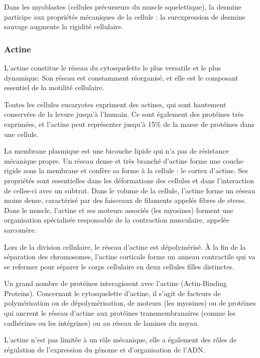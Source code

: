 Dans les myoblastes (cellules précurseurs du muscle squelettique), la desmine participe aux propriétés mécaniques de la cellule : la surexpression de desmine sauvage augmente la rigidité cellulaire. 





\subsubsection{Actine}
  
L'actine constitue le réseau du cytosquelette le plus versatile et le plus dynamique. Son réseau est constamment réorganisé, et elle est le composant essentiel de la motilité cellulaire. 

Toutes les cellules eucaryotes expriment des actines, qui sont hautement conservées de la levure jusqu'à l'humain. Ce sont également des protéines très exprimées, et l'actine peut représenter jusqu'à 15\% de la masse de protéines dans une cellule. 

La membrane plasmique est une bicouche lipide qui n'a pas de résistance mécanique propre. Un réseau dense et très branché d'actine forme une couche rigide sous la membrane et confère sa forme à la cellule : le cortex d'actine. Ses propriétés sont essentielles dans les déformations des cellules et dans l'interaction de celles-ci avec un subtrat. 
Dans le volume de la cellule, l'actine forme un réseau moins dense, caractérisé par des faisceaux de filaments appelés fibres de stress. 
Dans le muscle, l'actine et ses moteurs associés (les myosines) forment une organisation spécialisée responsable de la contraction musculaire, appelée sarcomère. 

Lors de la division cellulaire, le réseau d'actine est dépolymérisé. À la fin de la séparation des chromosomes, l'actine corticale forme un anneau contractile qui va se refermer pour séparer le corps cellulaire en deux cellules filles distinctes. 

Un grand nombre de protéines interagissent avec l'actine (Actin-Binding Proteins). Concernant le cytosquelette d'actine, il s'agit de facteurs de polymérisation ou de dépolymérisation, de moteurs (les myosines) ou de protéines qui ancrent le réseau d'actine aux protéines transmembranaires (comme les cadhérines ou les intégrines) ou au réseau de lamines du noyau. 

L'actine n'est pas limitée à un rôle mécanique, elle a également des rôles de régulation de l'expression du génome et d'organisation de l'ADN. 

